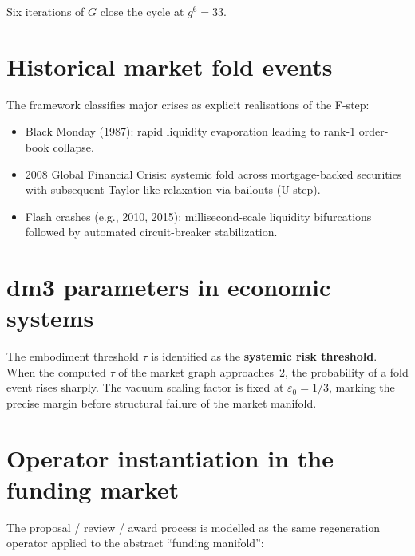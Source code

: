 Six iterations of \(G\) close the cycle at \(g^6 = 33\).

\section{Historical market fold events}

The framework classifies major crises as explicit realisations of the F-step:

\begin{itemize}
\item Black Monday (1987): rapid liquidity evaporation leading to rank-1 order-book collapse.
\item 2008 Global Financial Crisis: systemic fold across mortgage-backed securities with subsequent Taylor-like relaxation via bailouts (U-step).
\item Flash crashes (e.g., 2010, 2015): millisecond-scale liquidity bifurcations followed by automated circuit-breaker stabilization.
\end{itemize}

\section{dm3 parameters in economic systems}

The embodiment threshold \(\tau\) is identified as the \textbf{systemic risk threshold}. When the computed \(\tau\) of the market graph approaches~2, the probability of a fold event rises sharply. The vacuum scaling factor is fixed at $\varepsilon_0 = 1/3$, marking the precise margin before structural failure of the market manifold.

\section{Operator instantiation in the funding market}

The proposal / review / award process is modelled as the same regeneration operator applied to the abstract ``funding manifold'':

